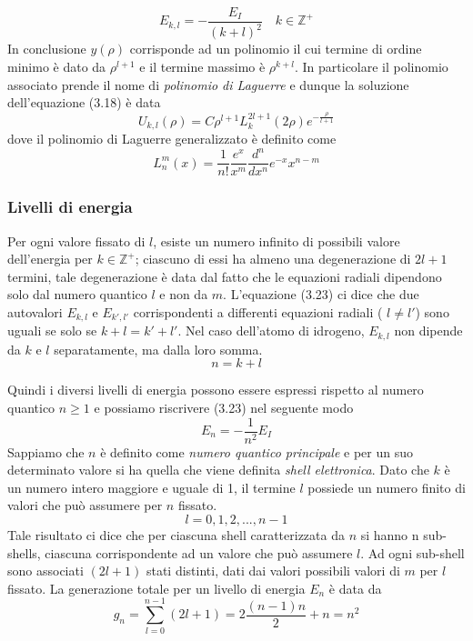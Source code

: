 \begin{equation}
	E_{k,l} = -\frac{E_I}{(k+l)^2} \quad k \in \mathbb{Z}^+
\end{equation}
In conclusione $y(\rho)$ corrisponde ad un polinomio il cui termine di ordine minimo \`e dato da $\rho^{l+1}$ e il termine massimo \`e $\rho^{k+l}$. In particolare il polinomio associato prende il nome di \textit{polinomio di Laguerre} e dunque la soluzione dell'equazione (3.18) \`e data 
\begin{equation*}
	U_{k,l}(\rho) = C \rho^{l+1}L^{2l+1}_{k}(2\rho) e^{-\frac{\rho}{l+1}} 
\end{equation*}
dove il polinomio di Laguerre generalizzato \`e definito come
\begin{equation*}
	L_{n}^{m}(x) = \frac{1}{n!} \frac{e^x}{x^m} \frac{d^n}{dx^n}e^{-x}x^{n-m}
\end{equation*}

\subsubsection{Livelli di energia}
Per ogni valore fissato di $l$, esiste un numero infinito di possibili valore dell'energia per $k \in \mathbb{Z}^+$; ciascuno di essi ha almeno una degenerazione di $2l+1$ termini, tale degenerazione \`e data dal fatto che le equazioni radiali dipendono solo dal numero quantico $l$ e non da $m$. L'equazione (3.23) ci dice che due autovalori $E_{k,l}$ e $E_{k',l'}$ corrispondenti a differenti equazioni radiali ( $l \neq l'$) sono uguali se solo se $k+l = k' + l'$. Nel caso dell'atomo di idrogeno, $E_{k,l}$ non dipende da $k$ e $l$ separatamente, ma dalla loro somma.
\begin{equation*}
	n = k+l
\end{equation*}

\noindent Quindi i diversi livelli di energia possono essere espressi rispetto al numero quantico $n \geq 1$ e possiamo riscrivere (3.23) nel seguente modo
\begin{equation}
	E_n = -\frac{1}{n^2}E_I
\end{equation}
Sappiamo che $n$ \`e definito come \textit{numero quantico principale} e per un suo determinato valore si ha quella che viene definita \textit{shell elettronica}. Dato che $k$ \`e un numero intero maggiore e uguale di 1, il termine $l$ possiede un numero finito di valori che pu\`o assumere per $n$ fissato.
\begin{equation*}
	l = 0,1,2,...,n-1
\end{equation*}
Tale risultato ci dice che per ciascuna shell caratterizzata da $n$ si hanno n sub-shells, ciascuna corrispondente ad un valore che pu\`o assumere $l$. Ad ogni sub-shell sono associati $(2l+1)$ stati distinti, dati dai valori possibili valori di $m$ per $l$ fissato. La generazione totale per un livello di energia $E_n$ \`e data da
\begin{equation*}
	g_n = \sum_{l=0}^{n-1}(2l+1) = 2\frac{(n-1)n}{2} + n = n^2
\end{equation*}

